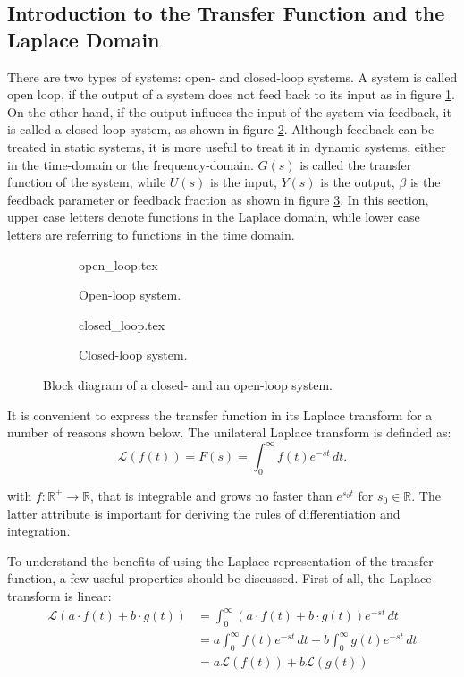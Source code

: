 \subsection{Introduction to the Transfer Function and the Laplace Domain}%
\label{sec:transfer_function}
There are two types of systems: open- and closed-loop systems. A system is called open loop, if the output of a system does not feed back to its input as in figure \ref{fig:open_loop}. On the other hand, if the output influces the input of the system via feedback, it is called a closed-loop system, as shown in figure \ref{fig:closed_loop}. Although feedback can be treated in static systems, it is more useful to treat it in dynamic systems, either in the time-domain or the frequency-domain. $G(s)$ is called the transfer function of the system, while $U(s)$ is the input, $Y(s)$ is the output, $\beta$ is the feedback parameter or feedback fraction as shown in figure \ref{fig:feedback_systems}. In this section, upper case letters  denote functions in the Laplace domain, while lower case letters are referring to functions in the time domain.

\begin{figure}[ht]
    \centering
    \begin{subfigure}{0.4\linewidth}
        \centering
        {open_loop.tex}
        \caption{Open-loop system.}
        \label{fig:open_loop}
    \end{subfigure}
    \begin{subfigure}{0.4\linewidth}
        \centering
        {closed_loop.tex}
        \caption{Closed-loop system.}
        \label{fig:closed_loop}
    \end{subfigure}
    \caption{Block diagram of a closed- and an open-loop system.}
    \label{fig:feedback_systems}
\end{figure}

It is convenient to express the transfer function in its Laplace transform for a number of reasons shown below. The unilateral Laplace transform is definded as:
\begin{equation}
    \mathscr{L}\left( f(t) \right) = F(s) = \int_0^\infty f(t) e^{-st}\,dt.
\end{equation}

with $f: \mathbb{R}^+ \to \mathbb{R}$, that is integrable and grows no faster than $e^{s_0t}$ for $s_0 \in \mathbb{R}$. The latter attribute is important for deriving the rules of differentiation and integration.

To understand the benefits of using the Laplace representation of the transfer function, a few useful properties should be discussed. First of all, the Laplace transform is linear:
\begin{align}
    \mathscr{L}\left(a \cdot f(t) + b \cdot g(t) \right) &= \int_0^\infty (a \cdot f(t) + b \cdot g(t)) e^{-st}\,dt \nonumber\\
    &= a \int_0^\infty f(t) e^{-st}\,dt + b \int_0^\infty g(t) e^{-st}\,dt \nonumber\\
    &= a \mathscr{L}\left(f(t)\right) + b \mathscr{L}\left(g(t)\right)
\end{align}

